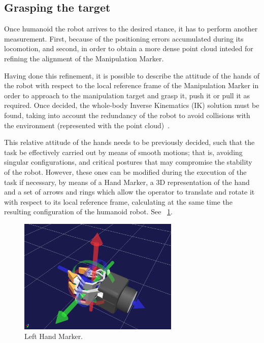 	\subsection{Grasping the target}
		
		Once humanoid the robot arrives to the desired stance, it has to perform another measurement.
		First, because of the positioning errors accumulated during its locomotion, and second,
		in order to obtain a more dense point cloud inteded for refining the alignment of the Manipulation Marker.
		
		Having done this refinement, it is possible to describe the attitude of the hands of the robot with respect
		to the local reference frame of the Manipulation Marker in order to approach to the manipulation target and
		grasp it, push it or pull it as required.
		Once decided, the whole-body Inverse Kinematics (IK) solution must be found, taking into account the redundancy
		of the robot to avoid collisions with the environment (represented with the point cloud)~\cite{Kanoun}.
		
		This relative attitude of the hands needs to be previously decided, such that the task be effectively carried
		out by means of smooth motions; that is, avoiding singular configurations, and critical postures that may
		compromise the stability of the robot.
		However, these ones can be modified during the execution of the task if necessary, by means of a Hand Marker,
		a 3D representation of the hand and a set of arrows and rings which allow the operator to translate and rotate it
		with respect to its local reference frame, calculating at the same time the resulting configuration of the
		humanoid robot.
		See \figurename~\ref{fig:HandMarker}.
		
		\begin{figure}[b]
			\centering
			\includegraphics[height = 5.5cm]{img/HandMarker}
			\caption{Left Hand Marker.}
			\label{fig:HandMarker}
		\end{figure}